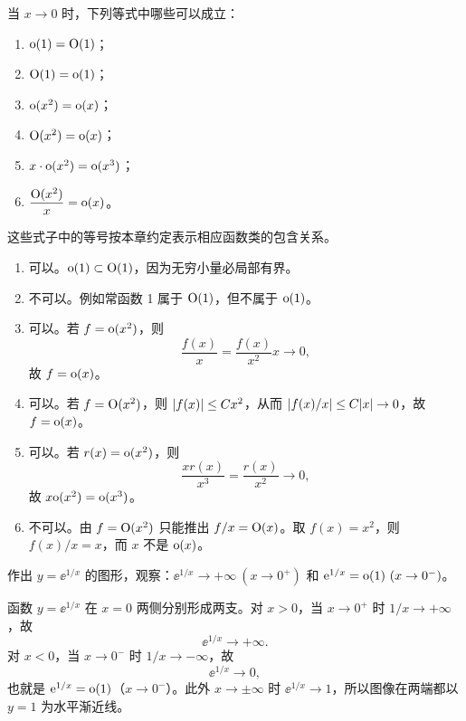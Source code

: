 \begin{xthought}[3]
当 $x\to0$ 时，下列等式中哪些可以成立：
  \begin{enumerate}
    \item $\mathrm{o}(1)=\mathrm{O}(1)$；
    \item $\mathrm{O}(1)=\mathrm{o}(1)$；
    \item $\mathrm{o}(x^2)=\mathrm{o}(x)$；
    \item $\mathrm{O}(x^2)=\mathrm{o}(x)$；
    \item $x\cdot\mathrm{o}(x^2)=\mathrm{o}(x^3)$；
    \item $\dfrac{\mathrm{O}(x^2)}x=\mathrm{o}(x)$。
  \end{enumerate}
\end{xthought}
\begin{xsolution}
这些式子中的等号按本章约定表示相应函数类的包含关系。
\begin{enumerate}[label=(\arabic*)]
  \item 可以。$\mathrm{o}(1)\subset\mathrm{O}(1)$，因为无穷小量必局部有界。
  \item 不可以。例如常函数 1 属于 $\mathrm{O}(1)$，但不属于 $\mathrm{o}(1)$。
  \item 可以。若 $f=\mathrm{o}(x^2)$，则
  \[
    \frac{f(x)}x=\frac{f(x)}{x^2}x\to0,
  \]
  故 $f=\mathrm{o}(x)$。
  \item 可以。若 $f=\mathrm{O}(x^2)$，则 $\lvert f(x)\rvert\leq Cx^2$，从而
  $\lvert f(x)/x\rvert\leq C\lvert x\rvert\to0$，故 $f=\mathrm{o}(x)$。
  \item 可以。若 $r(x)=\mathrm{o}(x^2)$，则
  \[
    \frac{x r(x)}{x^3}=\frac{r(x)}{x^2}\to0,
  \]
  故 $x\mathrm{o}(x^2)=\mathrm{o}(x^3)$。
  \item 不可以。由 $f=\mathrm{O}(x^2)$ 只能推出 $f/x=\mathrm{O}(x)$。取 $f(x)=x^2$，则
  $f(x)/x=x$，而 $x$ 不是 $\mathrm{o}(x)$。
\end{enumerate}
\end{xsolution}


\begin{xthought}[4]
作出 $y=\ee^{1/x}$ 的图形，观察：$\ee^{1/x}\to+\infty\ (x\to0^+)$ 和 $\ee^{1/x}=\littleo(1)\ (x\to0^-)$。
\end{xthought}
\begin{xsolution}
函数 $y=\ee^{1/x}$ 在 $x=0$ 两侧分别形成两支。对 $x>0$，当 $x\to0^+$ 时 $1/x\to+\infty$，故
\[
  \ee^{1/x}\to+\infty.
\]
对 $x<0$，当 $x\to0^-$ 时 $1/x\to-\infty$，故
\[
  \ee^{1/x}\to0,
\]
也就是 $\mathrm{e}^{1/x}=\mathrm{o}(1)$（$x\to0^-$）。此外 $x\to\pm\infty$ 时 $\ee^{1/x}\to1$，所以图像在两端都以 $y=1$ 为水平渐近线。
\end{xsolution}


